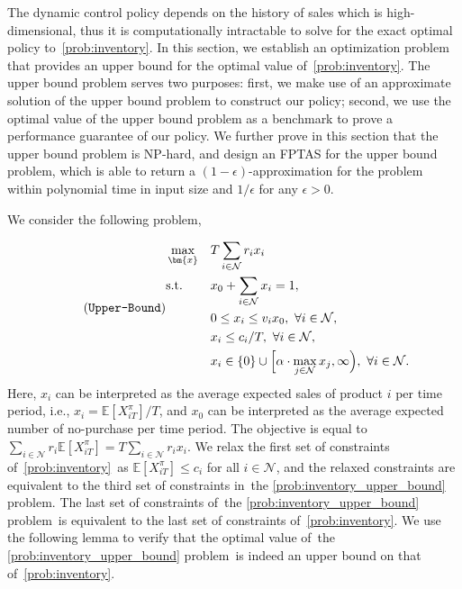 \documentclass[mnsc,non-blindrev]{informs3}
\theoremstyle{definition}
\begin{document}
The dynamic control policy depends on the history of sales which is high-dimensional, thus it is computationally intractable to solve for the exact optimal policy to~\ref{prob:inventory}. In this section, we establish an optimization problem that provides an upper bound for the optimal value of~\ref{prob:inventory}. The upper bound problem serves two purposes: first, we make use of an approximate solution of the upper bound problem to construct our policy; second, we use the optimal value of the upper bound problem as a benchmark to prove a performance guarantee of our policy. We further prove in this section that the upper bound problem is NP-hard, and design an FPTAS for the upper bound problem, which is able to return a $(1-\epsilon)$-approximation for the problem within polynomial time in input size and $1/\epsilon$ for any $\epsilon>0$. 

We consider the following problem,

\begin{equation}\label{prob:inventory_upper_bound}
\tag{\texttt{Upper-Bound}}
\begin{aligned}
&\max_{\bm{x}}&&{T\sum_{i\in\mathcal{N}}r_ix_i}\\
&\text{s.t.}&&{x_0+\sum_{i\in\mathcal{N}}x_i=1},\\
&&&{0\leq x_i\leq v_ix_0,\ \forall i\in\mathcal{N}},\\
&&&{x_i\leq c_i/T,\ \forall i\in\mathcal{N}},\\
&&&{x_i\in\{0\}\cup\Big[\alpha\cdot\max_{j\in\mathcal{N}}x_j,\infty\Big),\ \forall i\in\mathcal{N}.}
\end{aligned}
\end{equation}
Here, $x_i$ can be interpreted as the average expected sales of product $i$ per time period, i.e.,  $x_i=\mathbb{E}[X_{iT}^\pi]/T$, and $x_0$ can be interpreted as the average expected number of no-purchase per time period. The objective is equal to $\sum_{i\in\mathcal{N}}r_i\mathbb{E}[X_{iT}^\pi]=T\sum_{i\in\mathcal{N}}r_ix_i$. We relax the first set of constraints of~\ref{prob:inventory}~as $\mathbb{E}[X_{iT}^\pi]\leq c_i$ for all $i\in\mathcal{N}$, and the relaxed constraints are equivalent to the third set of constraints in~the \ref{prob:inventory_upper_bound} problem. The last set of constraints of~the \ref{prob:inventory_upper_bound} problem~is equivalent to the last set of constraints of~\ref{prob:inventory}. We use the following lemma to verify that the optimal value of~the \ref{prob:inventory_upper_bound} problem~is indeed an upper bound on that of~\ref{prob:inventory}.
\end{document}
